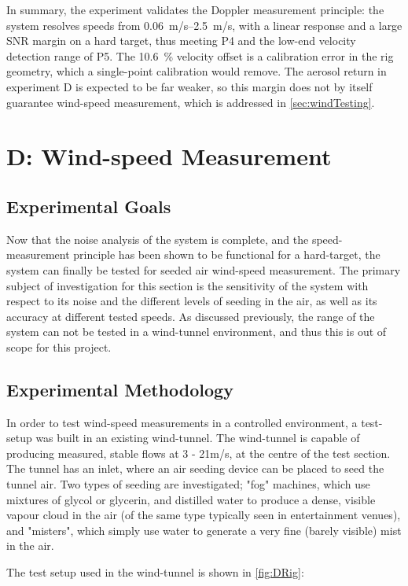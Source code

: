 In summary, the experiment validates the Doppler measurement principle: the system resolves
speeds from \SIrange{0.06}{2.5}{m/s}, with a linear response and a large SNR margin on a hard
target, thus meeting P4 and the low-end velocity detection range of P5. The \SI{10.6}{\percent} velocity offset is a calibration error in the rig geometry, which a
single-point calibration would remove. The aerosol return in experiment D is expected to be
far weaker, so this margin does not by itself guarantee wind-speed measurement, which is
addressed in \autoref{sec:windTesting}.




\section{D: Wind-speed Measurement}
\label{sec:windTesting}
\subsection{Experimental Goals}
Now that the noise analysis of the system is complete, and the speed-measurement principle has been shown to be functional for a hard-target, the system can finally be tested for seeded air wind-speed measurement. The primary subject of investigation for this section is the sensitivity of the system with respect to its noise and the different levels of seeding in the air, as well as its accuracy at different tested speeds. As discussed previously, the range of the system can not be tested in a wind-tunnel environment, and thus this is out of scope for this project. 
\subsection{Experimental Methodology}
In order to test wind-speed measurements in a controlled environment, a test-setup was built in an existing wind-tunnel. The wind-tunnel is capable of producing measured, stable flows at 3 - 21m/s, at the centre of the test section. The tunnel has an inlet, where an air seeding device can be placed to seed the tunnel air. Two types of seeding are investigated; "fog" machines, which use mixtures of glycol or glycerin, and distilled water to produce a dense, visible vapour cloud in the air (of the same type typically seen in entertainment venues), and "misters", which simply use water to generate a very fine (barely visible) mist in the air. 

The test setup used in the wind-tunnel is shown in \autoref{fig:DRig}:

